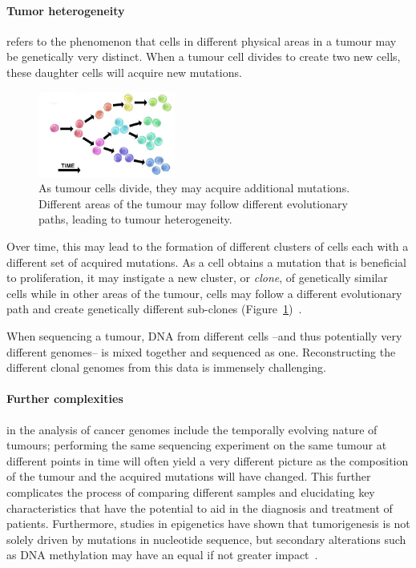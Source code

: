 \paragraph{Tumor heterogeneity} refers to the phenomenon that cells in different physical areas in a tumour may be genetically very distinct. When a tumour cell divides to create two new cells, these daughter cells will acquire new mutations.

\begin{figure}
    \centering
    \includegraphics[width=0.4\textwidth]{chapters/images/introduction/heterogeneity.jpg}

    \caption{As tumour cells divide, they may acquire additional mutations. Different areas of the tumour may follow different evolutionary paths, leading to tumour heterogeneity.}
    \label{fig:heterogeneity}
\end{figure}



Over time, this may lead to the formation of different clusters of cells each with a different set of acquired mutations. As a cell obtains a mutation that is beneficial to proliferation, it may instigate a new cluster, or \textit{clone}, of genetically similar cells while in other areas of the tumour, cells may follow a different evolutionary path and create genetically different sub-clones (Figure~\ref{fig:heterogeneity})~\cite{swanton2012intratumor}.

When sequencing a tumour, DNA from different cells --and thus potentially very different genomes-- is mixed together and sequenced as one. Reconstructing the different clonal genomes from this data is immensely challenging.


\paragraph{Further complexities} in the analysis of cancer genomes include the temporally evolving nature of tumours; performing the same sequencing experiment on the same tumour at different points in time will often yield a very different picture as the composition of the tumour and the acquired mutations will have changed. This further complicates the process of comparing different samples and elucidating key characteristics that have the potential to aid in the diagnosis and treatment of patients. Furthermore, studies in epigenetics have shown that tumorigenesis is not solely driven by mutations in nucleotide sequence, but secondary alterations such as DNA methylation may have an equal if not greater impact~\cite{pacchierotti2015environmental}.

